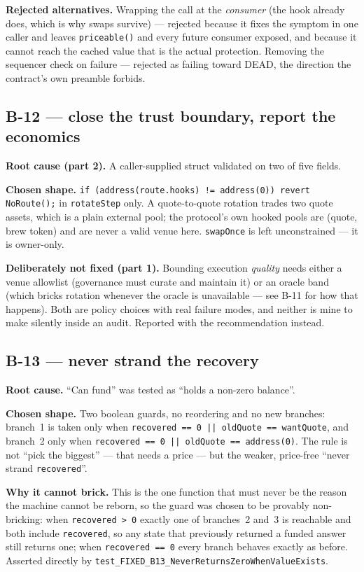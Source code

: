 \documentclass[11pt,a4paper]{article}
\newcommand{\code}[1]{\texttt{\small #1}}
\begin{document}
\textbf{Rejected alternatives.} Wrapping the call at the \emph{consumer} (the hook already
does, which is why swaps survive) --- rejected because it fixes the symptom in one caller
and leaves \code{priceable()} and every future consumer exposed, and because it cannot
reach the cached value that is the actual protection. Removing the sequencer check on
failure --- rejected as failing toward DEAD, the direction the contract's own preamble
forbids.

\subsection{B-12 --- close the trust boundary, report the economics}

\textbf{Root cause (part 2).} A caller-supplied struct validated on two of five fields.

\textbf{Chosen shape.} \code{if (address(route.hooks) != address(0)) revert NoRoute();} in
\code{rotateStep} only. A quote-to-quote rotation trades two quote assets, which is a
plain external pool; the protocol's own hooked pools are (quote, brew token) and are never
a valid venue here. \code{swapOnce} is left unconstrained --- it is owner-only.

\textbf{Deliberately not fixed (part 1).} Bounding execution \emph{quality} needs either a
venue allowlist (governance must curate and maintain it) or an oracle band (which bricks
rotation whenever the oracle is unavailable --- see B-11 for how that happens). Both are
policy choices with real failure modes, and neither is mine to make silently inside an
audit. Reported with the recommendation instead.

\subsection{B-13 --- never strand the recovery}

\textbf{Root cause.} ``Can fund'' was tested as ``holds a non-zero balance''.

\textbf{Chosen shape.} Two boolean guards, no reordering and no new branches: branch~1 is
taken only when \code{recovered == 0 || oldQuote == wantQuote}, and branch~2 only when
\code{recovered == 0 || oldQuote == address(0)}. The rule is not ``pick the biggest'' ---
that needs a price --- but the weaker, price-free ``never strand \code{recovered}''.

\textbf{Why it cannot brick.} This is the one function that must never be the reason the
machine cannot be reborn, so the guard was chosen to be provably non-bricking: when
\code{recovered > 0} exactly one of branches~2 and~3 is reachable and both include
\code{recovered}, so any state that previously returned a funded answer still returns one;
when \code{recovered == 0} every branch behaves exactly as before. Asserted directly by
\code{test\_FIXED\_B13\_NeverReturnsZeroWhenValueExists}.
\end{document}
